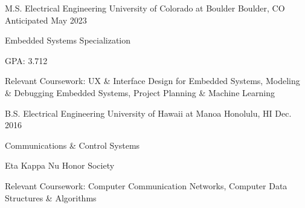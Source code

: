 

\begin{cventries}

  \cventry
    {M.S. Electrical Engineering} %
    {University of Colorado at Boulder} %
    {Boulder, CO} %
    {Anticipated May 2023} %
    {
        \begin{cvitems} %
            \item {Embedded Systems Specialization}
            \item {GPA: 3.712}
            \item {Relevant Coursework: UX \& Interface Design for Embedded Systems, Modeling \& Debugging Embedded Systems, Project Planning \& Machine Learning}
        \end{cvitems}
    }

  \cventry
    {B.S. Electrical Engineering} %
    {University of Hawaii at Manoa} %
    {Honolulu, HI} %
    {Dec. 2016} %
    {
        \begin{cvitems} %
            \item {Communications \& Control Systems}
            \item {Eta Kappa Nu Honor Society}
            \item {Relevant Coursework: Computer Communication Networks, Computer Data Structures \& Algorithms}
        \end{cvitems}
    }

\end{cventries}
